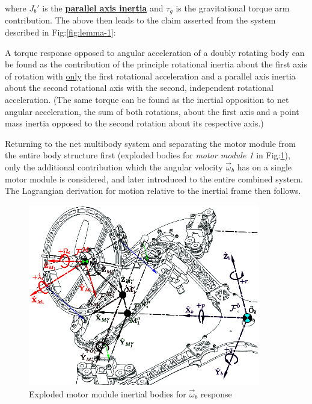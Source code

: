 where $J_b'$ is the \underline{\textbf{parallel axis inertia}} and $\tau_g$ is the gravitational torque arm contribution. The above then leads to the claim asserted from the system described in Fig:\ref{fig:lemma-1}:
\begin{axiom}\label{lem:1}
A torque response opposed to angular acceleration of a doubly rotating body can be found as the contribution of the principle rotational inertia about the first axis of rotation with \underline{only} the first rotational acceleration and a parallel axis inertia about the second rotational axis with the second, independent rotational acceleration. (The same torque can be found as the inertial opposition to net angular acceleration, the sum of both rotations, about the first axis and a point mass inertia opposed to the second rotation about its respective axis.)
\end{axiom}
Returning to the net multibody system and separating the motor module from the entire body structure first (exploded bodies for \emph{motor module 1} in Fig:\ref{fig:response-body}), only the additional contribution which the angular velocity $\vec{\omega}_b$ has on a single motor module is considered, and later introduced to the entire combined system. The Lagrangian derivation for motion relative to the inertial frame then follows.
\par
\begin{figure}[htbp]
\vspace{-12pt}
\centering
\includegraphics[width=0.9\textwidth]{figs/response-body}
\vspace{-8pt}
\caption{Exploded motor module inertial bodies for $\vec{\omega}_b$ response}
\label{fig:response-body}
\vspace{-18pt}
\end{figure}
